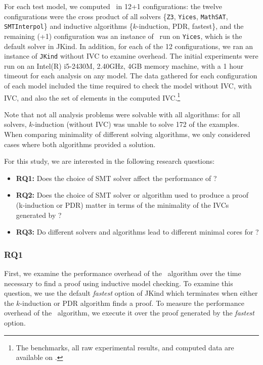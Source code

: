 For each test model, we computed \ucalg\ in 12+1 configurations: the
twelve configurations were the cross product of all solvers \{\texttt{Z3},
\texttt{Yices}, \texttt{MathSAT}, \texttt{SMTInterpol}\} and inductive algorithms
\{$k$-induction, PDR, fastest\}, and the remaining (+1) configuration
was an instance of \bfalg\ run on \texttt{Yices}, which is the default solver in
JKind.
 In addition, for each of the 12 configurations, we ran an
instance of \texttt{JKind} without IVC to examine overhead. The initial experiments
were run on an Intel(R) i5-2430M, 2.40GHz, 4GB memory machine, with a
1 hour timeout for each analysis on any model. The data gathered for
each configuration of each model included the time required to check
the model without IVC, with IVC, and also the set of elements in the
computed IVC.\footnote{The benchmarks, all raw experimental results,
  and computed data are available on \cite{expr}.}

Note that not all analysis problems were solvable with all algorithms: for all solvers, $k$-induction (without IVC) was unable to solve 172 of the examples.  When comparing minimality of different solving algorithms, we only considered cases where both algorithms provided a solution.

For this study, we are interested in the following research questions:
\begin{itemize}
  \item \textbf{RQ1:} Does the choice of SMT solver affect the performance of \ucalg ?
  \item \textbf{RQ2:} Does the choice of SMT solver or algorithm used to produce a proof
(k-induction or PDR) matter in terms of the minimality of the IVCs generated by \ucalg ?
  \item \textbf{RQ3:} Do different solvers and algorithms
lead to different minimal cores for \ucalg ?
\end{itemize}

\vspace{0.1in}
\subsubsection{RQ1}
First, we examine the performance overhead of the \ucalg\ algorithm over the time necessary to find a proof using inductive model checking.  To examine this question, we use the default {\em fastest} option of JKind which terminates when either the $k$-induction or PDR algorithm finds a proof.  To measure the performance overhead of the \ucalg\ algorithm, we execute it over the proof generated by the {\em fastest} option.

